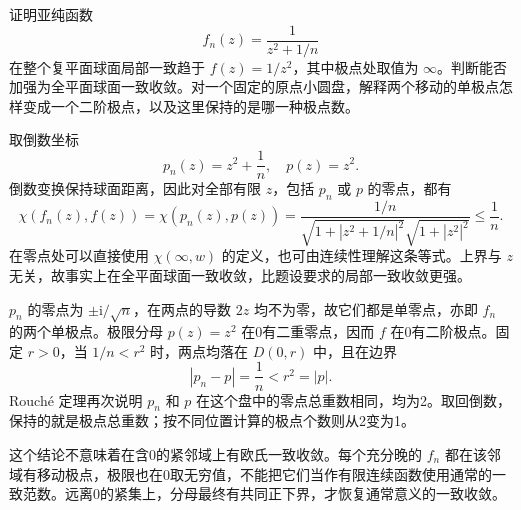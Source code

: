 \begin{exercise}\label{b3:ex:04-7}
证明亚纯函数
\[
 f_n(z)=\frac1{z^2+1/n}
\]
在整个复平面球面局部一致趋于 \(f(z)=1/z^2\)，其中极点处取值为 \(\infty\)。判断能否加强为全平面球面一致收敛。对一个固定的原点小圆盘，解释两个移动的单极点怎样变成一个二阶极点，以及这里保持的是哪一种极点数。
\end{exercise}
\begin{solution}
取倒数坐标
\[
 p_n(z)=z^2+\frac1n,\quad p(z)=z^2.
\]
倒数变换保持球面距离，因此对全部有限 \(z\)，包括 \(p_n\) 或 \(p\) 的零点，都有
\[
 \chi(f_n(z),f(z))
 =\chi(p_n(z),p(z))
 =\frac{1/n}{\sqrt{1+|z^2+1/n|^2}\sqrt{1+|z^2|^2}}
 \le\frac1n.
\]
在零点处可以直接使用 \(\chi(\infty,w)\) 的定义，也可由连续性理解这条等式。上界与 \(z\) 无关，故事实上在全平面球面一致收敛，比题设要求的局部一致收敛更强。

\(p_n\) 的零点为 \(\pm\mathrm{i}/\sqrt n\)，在两点的导数 \(2z\) 均不为零，故它们都是单零点，亦即 \(f_n\) 的两个单极点。极限分母 \(p(z)=z^2\) 在0有二重零点，因而 \(f\) 在0有二阶极点。固定 \(r>0\)，当 \(1/n<r^2\) 时，两点均落在 \(D(0,r)\) 中，且在边界
\[
 |p_n-p|=\frac1n<r^2=|p|.
\]
Rouché 定理再次说明 \(p_n\) 和 \(p\) 在这个盘中的零点总重数相同，均为2。取回倒数，保持的就是极点总重数；按不同位置计算的极点个数则从2变为1。

这个结论不意味着在含0的紧邻域上有欧氏一致收敛。每个充分晚的 \(f_n\) 都在该邻域有移动极点，极限也在0取无穷值，不能把它们当作有限连续函数使用通常的一致范数。远离0的紧集上，分母最终有共同正下界，才恢复通常意义的一致收敛。
\end{solution}

